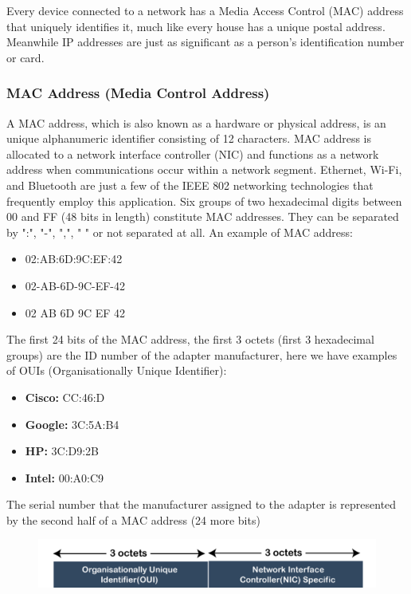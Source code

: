 \documentclass{article}
\begin{document}
Every device connected to a network has a Media Access Control (MAC) address that uniquely identifies it, much like every house has a unique postal address. Meanwhile IP addresses are just as significant as a person's identification number or card. 

\subsubsection{MAC Address (Media Control Address)}

A MAC address, which is also known as a hardware or physical address, is an unique alphanumeric identifier consisting of 12 characters. MAC address is allocated to a network interface controller (NIC) and functions as a network address when communications occur within a network segment. Ethernet, Wi-Fi, and Bluetooth are just a few of the IEEE 802 networking technologies that frequently employ this application. Six groups of two hexadecimal digits between 00 and FF (48 bits in length) constitute MAC addresses. They can be separated by ":", "-", ",", " " or not separated at all. An example of MAC address:
\begin{itemize}
    \item 02:AB:6D:9C:EF:42
    \item 02-AB-6D-9C-EF-42
    \item 02 AB 6D 9C EF 42
\end{itemize}

The first 24 bits of the MAC address, the first 3 octets (first 3 hexadecimal groups) are the ID number of the adapter manufacturer, here we have examples of OUIs (Organisationally Unique Identifier):

\begin{itemize}
    \item \textbf{Cisco:} CC:46:D
    \item \textbf{Google:} 3C:5A:B4 
    \item \textbf{HP:} 3C:D9:2B
    \item \textbf{Intel:} 00:A0:C9
\end{itemize}

The serial number that the manufacturer assigned to the adapter is represented by the second half of a MAC address (24 more bits)

\begin{figure}[H]
    \includegraphics[width=\textwidth]{pictures/mac.png}
    \centering
\end{figure}
\end{document}
